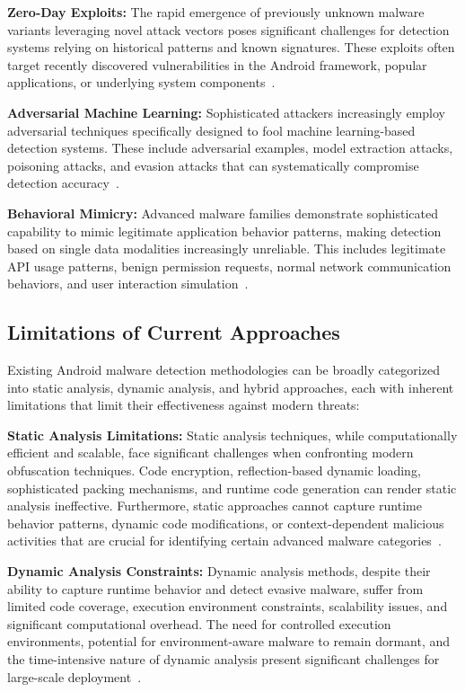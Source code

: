 \documentclass[a4paper,11pt]{article}
\begin{document}
\textbf{Zero-Day Exploits:} The rapid emergence of previously unknown malware variants leveraging novel attack vectors poses significant challenges for detection systems relying on historical patterns and known signatures. These exploits often target recently discovered vulnerabilities in the Android framework, popular applications, or underlying system components~\cite{ZeroDayThreats2023}.

\textbf{Adversarial Machine Learning:} Sophisticated attackers increasingly employ adversarial techniques specifically designed to fool machine learning-based detection systems. These include adversarial examples, model extraction attacks, poisoning attacks, and evasion attacks that can systematically compromise detection accuracy~\cite{AdversarialML2023}.

\textbf{Behavioral Mimicry:} Advanced malware families demonstrate sophisticated capability to mimic legitimate application behavior patterns, making detection based on single data modalities increasingly unreliable. This includes legitimate API usage patterns, benign permission requests, normal network communication behaviors, and user interaction simulation~\cite{BehavioralMimicry2023}.

\subsection{Limitations of Current Approaches}

Existing Android malware detection methodologies can be broadly categorized into static analysis, dynamic analysis, and hybrid approaches, each with inherent limitations that limit their effectiveness against modern threats:

\textbf{Static Analysis Limitations:} Static analysis techniques, while computationally efficient and scalable, face significant challenges when confronting modern obfuscation techniques. Code encryption, reflection-based dynamic loading, sophisticated packing mechanisms, and runtime code generation can render static analysis ineffective. Furthermore, static approaches cannot capture runtime behavior patterns, dynamic code modifications, or context-dependent malicious activities that are crucial for identifying certain advanced malware categories~\cite{StaticAnalysisLimitations2023}.

\textbf{Dynamic Analysis Constraints:} Dynamic analysis methods, despite their ability to capture runtime behavior and detect evasive malware, suffer from limited code coverage, execution environment constraints, scalability issues, and significant computational overhead. The need for controlled execution environments, potential for environment-aware malware to remain dormant, and the time-intensive nature of dynamic analysis present significant challenges for large-scale deployment~\cite{DynamicAnalysisConstraints2023}.
\end{document}
